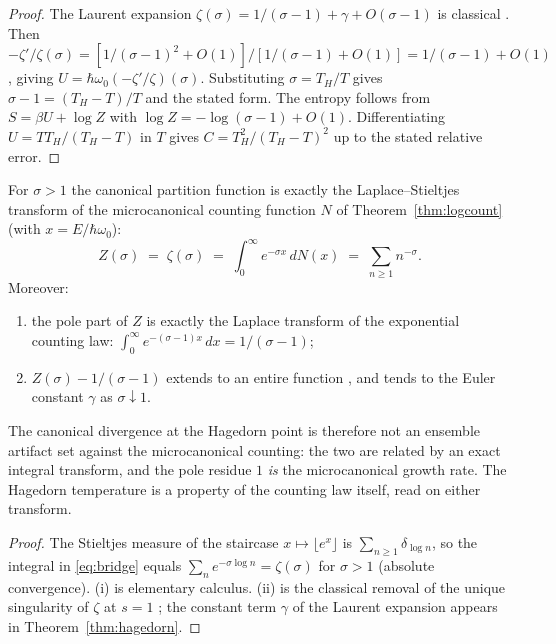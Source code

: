 \begin{proof}
The Laurent expansion $\zeta(\sigma)=1/(\sigma-1)+\gamma+O(\sigma-1)$ is classical
\cite{titchmarsh1986}. Then
$-\zeta'/\zeta(\sigma)=[1/(\sigma-1)^{2}+O(1)]/[1/(\sigma-1)+O(1)]=1/(\sigma-1)+O(1)$, giving
$U=\hbar\omega_{0}(-\zeta'/\zeta)(\sigma)$. Substituting $\sigma=T_{H}/T$ gives
$\sigma-1=(T_{H}-T)/T$ and the stated form. The entropy follows from
$S=\beta U+\log Z$ with $\log Z=-\log(\sigma-1)+O(1)$. Differentiating $U=T T_{H}/(T_{H}-T)$
in $T$ gives $C=T_{H}^{2}/(T_{H}-T)^{2}$ up to the stated relative error.
\end{proof}

\begin{proposition}\label{prop:bridge}
For $\sigma>1$ the canonical partition function is exactly the Laplace--Stieltjes transform
of the microcanonical counting function $N$ of Theorem~\ref{thm:logcount} (with
$x=E/\hbar\omega_{0}$):
\begin{equation}\label{eq:bridge}
Z(\sigma)\;=\;\zeta(\sigma)\;=\;\int_{0}^{\infty}e^{-\sigma x}\,dN(x)
\;=\;\sum_{n\geq1}n^{-\sigma}.
\end{equation}
Moreover:
\begin{enumerate}[leftmargin=1.6em]
\item the pole part of $Z$ is exactly the Laplace transform of the exponential counting law:
$\int_{0}^{\infty}e^{-(\sigma-1)x}\,dx=1/(\sigma-1)$;
\item $Z(\sigma)-1/(\sigma-1)$ extends to an entire function \cite{titchmarsh1986}, and tends
to the Euler constant $\gamma$ as $\sigma\downarrow1$.
\end{enumerate}
The canonical divergence at the Hagedorn point is therefore not an ensemble artifact set
against the microcanonical counting: the two are related by an exact integral transform, and
the pole residue $1$ \emph{is} the microcanonical growth rate. The Hagedorn temperature is a
property of the counting law itself, read on either transform.
\end{proposition}

\begin{proof}
The Stieltjes measure of the staircase $x\mapsto\lfloor e^{x}\rfloor$ is
$\sum_{n\geq1}\delta_{\log n}$, so the integral in \eqref{eq:bridge} equals
$\sum_{n}e^{-\sigma\log n}=\zeta(\sigma)$ for $\sigma>1$ (absolute convergence). (i) is
elementary calculus. (ii) is the classical removal of the unique singularity of $\zeta$ at
$s=1$ \cite{titchmarsh1986}; the constant term $\gamma$ of the Laurent expansion appears in
Theorem~\ref{thm:hagedorn}.
\end{proof}


